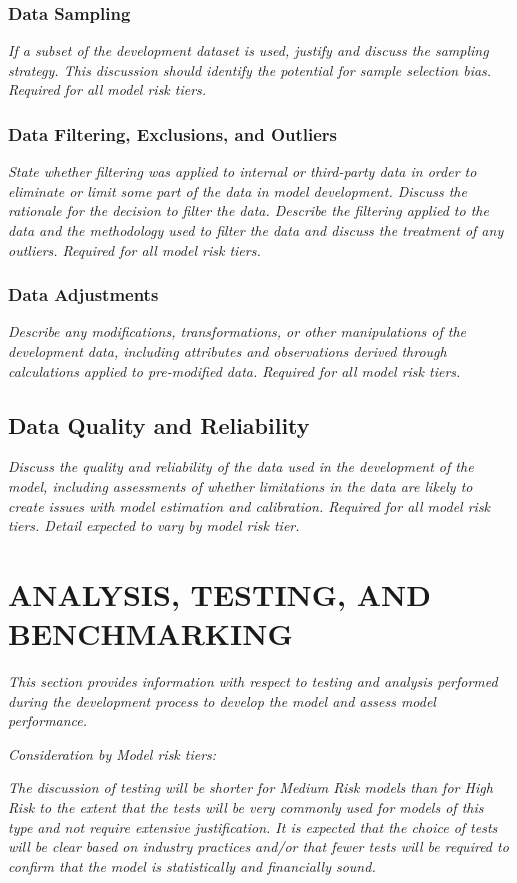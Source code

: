\documentclass[12pt,letterpaper]{article}
\begin{document}
\subsubsection{Data Sampling}
\textit{If a subset of the development dataset is used, justify and discuss the sampling strategy. This discussion should identify the potential for sample selection bias. Required for all model risk tiers.}

\subsubsection{Data Filtering, Exclusions, and Outliers}
\textit{State whether filtering was applied to internal or third-party data in order to eliminate or limit some part of the data in model development. Discuss the rationale for the decision to filter the data. Describe the filtering applied to the data and the methodology used to filter the data and discuss the treatment of any outliers. Required for all model risk tiers.}

\subsubsection{Data Adjustments}
\textit{Describe any modifications, transformations, or other manipulations of the development data, including attributes and observations derived through calculations applied to pre-modified data. Required for all model risk tiers.}

\subsection{Data Quality and Reliability}
\textit{Discuss the quality and reliability of the data used in the development of the model, including assessments of whether limitations in the data are likely to create issues with model estimation and calibration. Required for all model risk tiers. Detail expected to vary by model risk tier.}

\section{ANALYSIS, TESTING, AND BENCHMARKING}
\textit{This section provides information with respect to testing and analysis performed during the development process to develop the model and assess model performance.}

\textit{Consideration by Model risk tiers:}

\textit{The discussion of testing will be shorter for Medium Risk models than for High Risk to the extent that the tests will be very commonly used for models of this type and not require extensive justification. It is expected that the choice of tests will be clear based on industry practices and/or that fewer tests will be required to confirm that the model is statistically and financially sound.}
\end{document}
